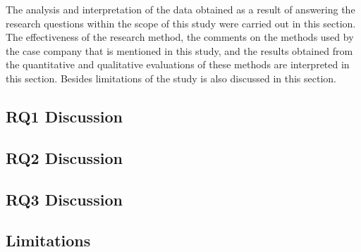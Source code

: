 The analysis and interpretation of the data obtained as a result of answering the research questions within the scope of this study were carried out in this section. The effectiveness of the research method, the comments on the methods used by the case company that is mentioned in this study, and the results obtained from the quantitative and qualitative evaluations of these methods are interpreted in this section. Besides limitations of the study is also discussed in this section.

\subsection{RQ1 Discussion}


\subsection{RQ2 Discussion}


\subsection{RQ3 Discussion}


\subsection{Limitations}
